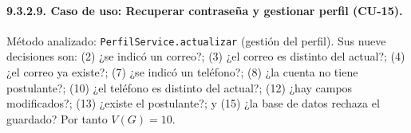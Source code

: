 \paragraph{9.3.2.9. Caso de uso: Recuperar contraseña y gestionar perfil (CU-15).}

Método analizado: \texttt{PerfilService.actualizar} (gestión del perfil). Sus nueve decisiones son: (2) ¿se indicó un correo?; (3) ¿el correo es distinto del actual?; (4) ¿el correo ya existe?; (7) ¿se indicó un teléfono?; (8) ¿la cuenta no tiene postulante?; (10) ¿el teléfono es distinto del actual?; (12) ¿hay campos modificados?; (13) ¿existe el postulante?; y (15) ¿la base de datos rechaza el guardado? Por tanto $V(G)=10$.

